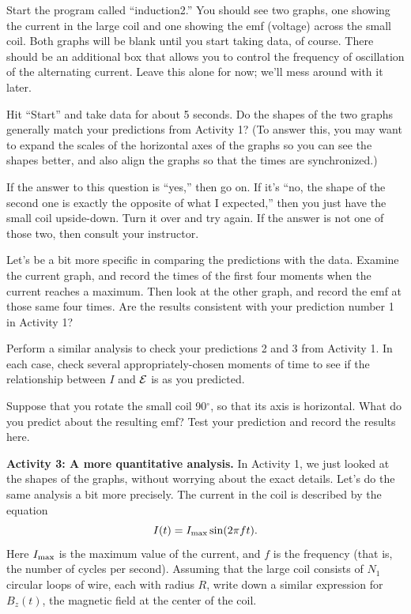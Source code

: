 Start the program called ``induction2.'' You should see two graphs,
one showing the current in the large coil and one showing the emf (voltage)
across the small coil.  Both graphs will be blank until you start taking
data, of course.  There should be an additional box that allows you to control
the frequency of oscillation of the alternating current.  Leave this alone
for now; we'll mess around with it later.

Hit ``Start'' and take data for about 5 seconds.  Do the shapes of the
two graphs generally match your predictions from Activity 1? (To answer this, you may want to expand the scales of the horizontal axes of the graphs so you can see the shapes better, and also align the graphs so that the times are synchronized.) 

\vskip 1in

If the answer to this question is ``yes,'' then go on.  If it's ``no,
the shape of the second one is exactly the opposite of what I expected,''
then you just have the small coil upside-down.  Turn it over and 
try again.  If the answer is not one of those two, then consult your 
instructor.

Let's be a bit more specific in comparing the predictions
with the data.  Examine the current graph, and record the
times of the first four moments when the current reaches a maximum.
Then look at the other graph, and record the emf at those same four times.
Are the results consistent with your prediction number 1 in Activity 1?

\vskip 1.5in

Perform a similar analysis to check your predictions 2 and 3 from Activity 1.
In each case, check several appropriately-chosen moments of time to see
if the relationship between $I$ and ${\cal E}$ is as you predicted.

\vskip 4in

Suppose that you rotate the small coil 90$^\circ$, so that its axis
is horizontal.  What do you predict about the resulting emf?
Test your prediction and record the results here.

\vskip 1in



{\bf Activity 3: A more quantitative analysis.}
In Activity 1, we just looked at the shapes of the graphs, without worrying
about the exact details.  Let's do the same analysis a bit more precisely.
The current in the coil is described by the equation
$$
I(t)=I_{\rm max}\sin(2\pi f t).
$$
Here $I_{\rm max}$ is the maximum value of the current, and
$f$ is the frequency (that is, the number of cycles per second).  
Assuming that the large coil consists of $N_1$ circular loops of
wire, each with radius $R$, write down a similar expression for
$B_z(t)$, the magnetic field at the center of the coil.

